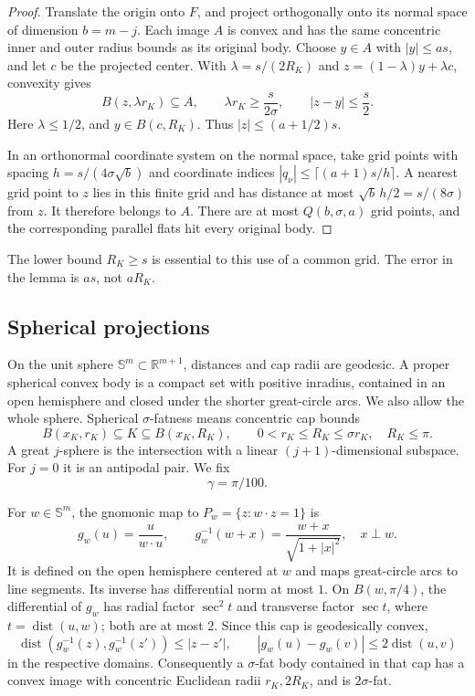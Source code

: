 \documentclass[11pt]{article}
\theoremstyle{remark}
\newcommand{\R}{\mathbb R}
\newcommand{\Sph}{\mathbb S}
\newcommand{\dist}{\operatorname{dist}}
\begin{document}
\begin{proof}
Translate the origin onto \(F\), and project orthogonally onto its normal
space of dimension \(b=m-j\). Each image \(A\) is convex and has the same
concentric inner and outer radius bounds as its original body.
Choose \(y\in A\) with \(|y|\leq as\), and let \(c\) be the projected
center. With
\(\lambda=s/(2R_K)\) and \(z=(1-\lambda)y+\lambda c\), convexity gives
\[
 B(z,\lambda r_K)\subseteq A,\qquad
 \lambda r_K\geq\frac{s}{2\sigma},\qquad
 |z-y|\leq\frac{s}{2}.
\]
Here \(\lambda\leq1/2\), and \(y\in B(c,R_K)\).
Thus \(|z|\leq(a+1/2)s\).

In an orthonormal coordinate system on the normal space, take grid
points with spacing \(h=s/(4\sigma\sqrt b)\) and coordinate indices
\(|q_\nu|\leq\lceil(a+1)s/h\rceil\).
A nearest grid point to \(z\) lies in this finite grid and has distance
at most \(\sqrt b\,h/2=s/(8\sigma)\) from \(z\).
It therefore belongs to \(A\).
There are at most \(Q(b,\sigma,a)\) grid points, and the corresponding
parallel flats hit every original body.
\end{proof}

The lower bound \(R_K\geq s\) is essential to this use of a common grid.
The error in the lemma is \(as\), not \(aR_K\).

\subsection{Spherical projections}

On the unit sphere \(\Sph^m\subset\R^{m+1}\), distances and cap radii
are geodesic. A proper spherical convex body is a compact set with
positive inradius, contained in an open hemisphere and closed under
the shorter great-circle arcs. We also allow the whole sphere.
Spherical \(\sigma\)-fatness means concentric cap bounds
\[
 B(x_K,r_K)\subseteq K\subseteq B(x_K,R_K),
 \qquad 0<r_K\leq R_K\leq\sigma r_K,\quad R_K\leq\pi.
\]
A great \(j\)-sphere is the intersection with a linear
\((j+1)\)-dimensional subspace. For \(j=0\) it is an antipodal pair.
We fix
\[
 \gamma=\pi/100.
\]

For \(w\in\Sph^m\), the gnomonic map to
\(P_w=\{z:w\cdot z=1\}\) is
\begin{equation}
 g_w(u)=\frac{u}{w\cdot u},\qquad
 g_w^{-1}(w+x)=\frac{w+x}{\sqrt{1+|x|^2}},
 \quad x\perp w.
 \label{eq:gnomonic}
\end{equation}
It is defined on the open hemisphere centered at \(w\) and maps
great-circle arcs to line segments.
Its inverse has differential norm at most \(1\).
On \(B(w,\pi/4)\), the differential of \(g_w\) has radial factor
\(\sec^2 t\) and transverse factor \(\sec t\), where \(t=\dist(u,w)\);
both are at most \(2\).
Since this cap is geodesically convex,
\begin{equation}
 \dist(g_w^{-1}(z),g_w^{-1}(z'))\leq|z-z'|,
 \qquad |g_w(u)-g_w(v)|\leq2\dist(u,v)
 \label{eq:gnomonic-bounds}
\end{equation}
in the respective domains.
Consequently a \(\sigma\)-fat body contained in that cap has a convex
image with concentric Euclidean radii \(r_K,2R_K\), and is
\(2\sigma\)-fat.
\end{document}
